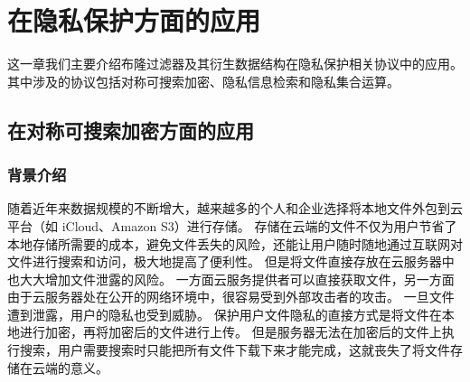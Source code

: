 
\chapter{在隐私保护方面的应用}\label{chp:application}


这一章我们主要介绍布隆过滤器及其衍生数据结构在隐私保护相关协议中的应用。
其中涉及的协议包括对称可搜索加密、隐私信息检索和隐私集合运算。

\section{在对称可搜索加密方面的应用}

\subsection{背景介绍}

随着近年来数据规模的不断增大，越来越多的个人和企业选择将本地文件外包到云平台（如 iCloud、Amazon S3）进行存储。
存储在云端的文件不仅为用户节省了本地存储所需要的成本，避免文件丢失的风险，还能让用户随时随地通过互联网对文件进行搜索和访问，极大地提高了便利性。
但是将文件直接存放在云服务器中也大大增加文件泄露的风险。
一方面云服务提供者可以直接获取文件，另一方面由于云服务器处在公开的网络环境中，很容易受到外部攻击者的攻击。
一旦文件遭到泄露，用户的隐私也受到威胁。
保护用户文件隐私的直接方式是将文件在本地进行加密，再将加密后的文件进行上传。
但是服务器无法在加密后的文件上执行搜索，用户需要搜索时只能把所有文件下载下来才能完成，这就丧失了将文件存储在云端的意义。

